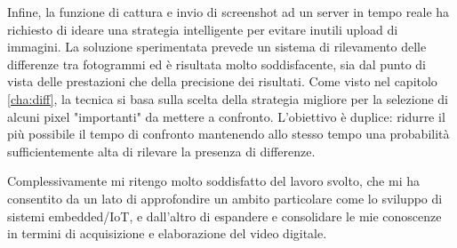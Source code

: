 Infine, la funzione di cattura e invio di screenshot ad un server in tempo reale ha richiesto di ideare una strategia intelligente per evitare inutili upload di immagini. La soluzione sperimentata prevede un sistema di rilevamento delle differenze tra fotogrammi ed è risultata molto soddisfacente, sia dal punto di vista delle prestazioni che della precisione dei risultati. Come visto nel capitolo \ref{cha:diff}, la tecnica si basa sulla scelta della strategia migliore per la selezione di alcuni pixel "importanti" da mettere a confronto. L'obiettivo è duplice: ridurre il più possibile il tempo di confronto mantenendo allo stesso tempo una probabilità sufficientemente alta di rilevare la presenza di differenze.

Complessivamente mi ritengo molto soddisfatto del lavoro svolto, che mi ha consentito da un lato di approfondire un ambito particolare come lo sviluppo di sistemi embedded/IoT, e dall'altro di espandere e consolidare le mie conoscenze in termini di acquisizione e elaborazione del video digitale.

